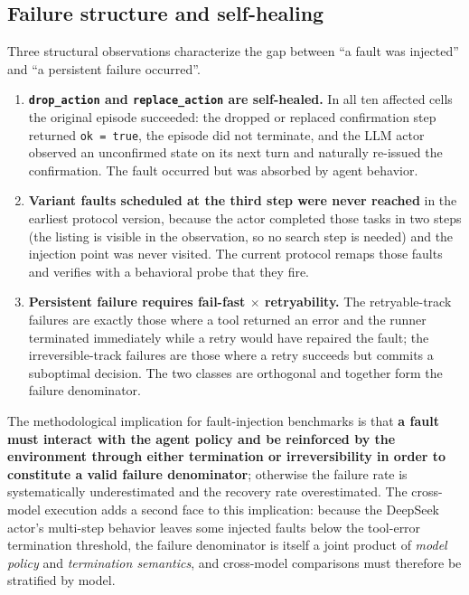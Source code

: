 \documentclass[review]{fcs}
\begin{document}
\subsection{Failure structure and self-healing}

Three structural observations characterize the gap between ``a fault was injected'' and ``a persistent failure occurred''.

\begin{enumerate}

  \item \textbf{\texttt{drop\_action} and \texttt{replace\_action} are self-healed.} In all ten affected cells the original episode succeeded: the dropped or replaced confirmation step returned \texttt{ok = true}, the episode did not terminate, and the LLM actor observed an unconfirmed state on its next turn and naturally re-issued the confirmation. The fault occurred but was absorbed by agent behavior.

  \item \textbf{Variant faults scheduled at the third step were never reached} in the earliest protocol version, because the actor completed those tasks in two steps (the listing is visible in the observation, so no search step is needed) and the injection point was never visited. The current protocol remaps those faults and verifies with a behavioral probe that they fire.

  \item \textbf{Persistent failure requires fail-fast $\times$ retryability.} The retryable-track failures are exactly those where a tool returned an error and the runner terminated immediately while a retry would have repaired the fault; the irreversible-track failures are those where a retry succeeds but commits a suboptimal decision. The two classes are orthogonal and together form the failure denominator.

\end{enumerate}

The methodological implication for fault-injection benchmarks is that \textbf{a fault must interact with the agent policy and be reinforced by the environment through either termination or irreversibility in order to constitute a valid failure denominator}; otherwise the failure rate is systematically underestimated and the recovery rate overestimated. The cross-model execution adds a second face to this implication: because the DeepSeek actor's multi-step behavior leaves some injected faults below the tool-error termination threshold, the failure denominator is itself a joint product of \emph{model policy} and \emph{termination semantics}, and cross-model comparisons must therefore be stratified by model.
\end{document}
